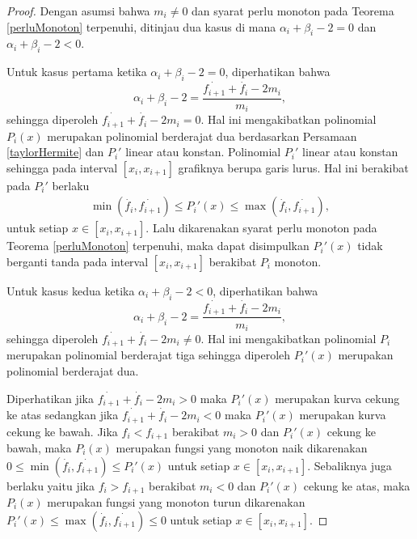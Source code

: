 \begin{proof}    
Dengan asumsi bahwa $m_i \neq 0$ dan syarat perlu monoton pada Teorema \ref{perluMonoton} terpenuhi, ditinjau dua kasus di mana $\alpha_i + \beta_i - 2 = 0$ dan $\alpha_i + \beta_i - 2 < 0$.

Untuk kasus pertama ketika $\alpha_i + \beta_i - 2 = 0$, diperhatikan bahwa 
$$\alpha_i + \beta_i - 2 = \frac{\dot{f_{i+1}}+\dot{f_i}-2m_i}{m_i},$$ sehingga diperoleh $\dot{f_{i+1}}+\dot{f_i}-2m_i = 0$. Hal ini mengakibatkan polinomial $P_i(x)$ merupakan polinomial berderajat dua berdasarkan Persamaan \eqref{taylorHermite} dan $P_i'$ linear atau konstan. Polinomial $P_i'$ linear atau konstan sehingga pada interval $[x_{i},x_{i+1}]$ grafiknya berupa garis lurus. Hal ini berakibat pada $P_i'$ berlaku 
\begin{align*}
    \min(\dot{f_i},\dot{f_{i+1}}) \leq P_i'(x) \leq \max(\dot{f_i},\dot{f_{i+1}}),
\end{align*} 
untuk setiap $x \in [x_i,x_{i+1}]$. Lalu dikarenakan syarat perlu monoton pada Teorema \ref{perluMonoton} terpenuhi, maka dapat disimpulkan $P_i'(x)$ tidak berganti tanda pada interval $[x_i,x_{i+1}]$ berakibat $P_i$ monoton.

Untuk kasus kedua ketika $\alpha_i + \beta_i - 2 < 0$, diperhatikan bahwa  $$\alpha_i + \beta_i - 2 = \frac{\dot{f_{i+1}}+\dot{f_i}-2m_i}{m_i},$$ sehingga diperoleh $\dot{f_{i+1}}+\dot{f_i}-2m_i \neq 0$. Hal ini mengakibatkan polinomial $P_i$ merupakan polinomial berderajat tiga sehingga diperoleh $P_i'(x)$ merupakan polinomial berderajat dua.

Diperhatikan jika $\dot{f_{i+1}}+\dot{f_i}-2m_i > 0$ maka $P_i'(x)$ merupakan kurva cekung ke atas sedangkan jika $\dot{f_{i+1}}+\dot{f_i}-2m_i < 0$ maka $P_i'(x)$ merupakan kurva cekung ke bawah. Jika $f_i < f_{i+1}$ berakibat $m_i > 0$ dan $P_i'(x)$ cekung ke bawah, maka $P_i(x)$ merupakan fungsi yang monoton naik dikarenakan $0 \leq \min(\dot{f_i},\dot{f_{i+1}}) \leq P_i'(x)$ untuk setiap $x \in [x_i,x_{i+1}]$. Sebaliknya juga berlaku yaitu jika $f_i > f_{i+1}$ berakibat $m_i < 0$ dan $P_i'(x)$ cekung ke atas, maka $P_i(x)$ merupakan fungsi yang monoton turun dikarenakan $P_i'(x) \leq \max(\dot{f_i},\dot{f_{i+1}}) \leq 0$ untuk setiap $x \in [x_i,x_{i+1}]$.
\end{proof}


